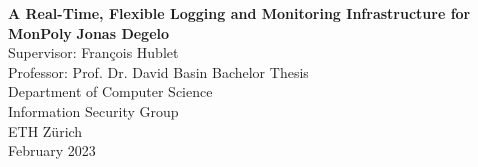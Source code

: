 \begin{titlepage}
    \begin{center}
        \vspace*{1cm}
        \Huge
        \textbf{A Real-Time, Flexible Logging and Monitoring Infrastructure for MonPoly}
        \vspace{0.5cm}
        \LARGE
        \vspace{1.5cm}
        \textbf{Jonas Degelo} \\
        \vspace{1.5cm}
        Supervisor: François Hublet \\
        Professor: Prof. Dr. David Basin
        \vfill
        Bachelor Thesis \\
        \vspace{0.8cm}
        \Large
        Department of Computer Science\\
        Information Security Group\\
        ETH Zürich\\
        February 2023
    \end{center}
\end{titlepage}